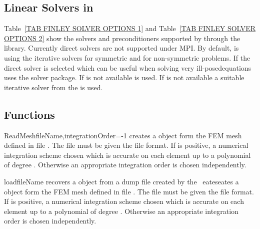 \subsection{Linear Solvers in \SolverOptions}
Table~\ref{TAB FINLEY SOLVER OPTIONS 1} and
Table~\ref{TAB FINLEY SOLVER OPTIONS 2} show the solvers and preconditioners supported by 
\finley through the \PASO library. Currently direct solvers are not supported under MPI. 
By default, \finley is using the iterative solvers \PCG for symmetric and \BiCGStab for non-symmetric problems. 
If the direct solver is selected which can be useful when solving very ill-posedequations
\finley uses the \MKL solver package. If \MKL is not available \UMFPACK is used. If \UMFPACK is not available 
a suitable iterative solver from the \PASO is used.

\subsection{Functions}
\begin{funcdesc}{ReadMesh}{fileName,integrationOrder=-1}
creates a \Domain object form the FEM mesh defined in 
file . The file must be given the \finley file format.
If  is positive, a numerical integration scheme
chosen which is accurate on each element up to a polynomial of
degree  . Otherwise
an appropriate integration order is chosen independently.
\end{funcdesc}

\begin{funcdesc}{load}{fileName}
recovers a \Domain object from a dump file created by the \ 
eateseates a \Domain object form the FEM mesh defined in 
file . The file must be given the \finley file format.
If \var{integrationOrder} is positive, a numerical integration scheme
chosen which is accurate on each element up to a polynomial of
degree  . Otherwise
an appropriate integration order is chosen independently.
\end{funcdesc}

